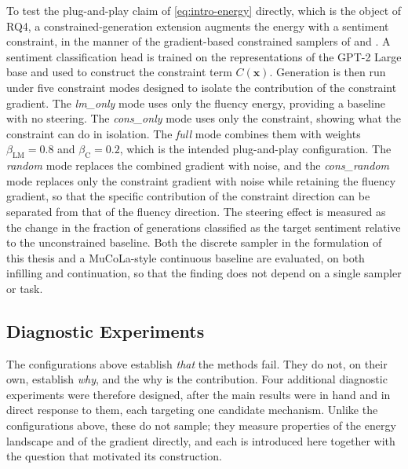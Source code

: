 To test the plug-and-play claim of \eqref{eq:intro-energy} directly, which is the object of RQ4, a constrained-generation extension augments the energy with a sentiment constraint, in the manner of the gradient-based constrained samplers of \citet{kumar2022gradient} and \citet{qin2022cold}. A sentiment classification head is trained on the representations of the GPT-2 Large base and used to construct the constraint term $C(\bm{x})$. Generation is then run under five constraint modes designed to isolate the contribution of the constraint gradient. The \emph{lm\_only} mode uses only the fluency energy, providing a baseline with no steering. The \emph{cons\_only} mode uses only the constraint, showing what the constraint can do in isolation. The \emph{full} mode combines them with weights $\beta_{\text{LM}} = 0.8$ and $\beta_{\text{C}} = 0.2$, which is the intended plug-and-play configuration. The \emph{random} mode replaces the combined gradient with noise, and the \emph{cons\_random} mode replaces only the constraint gradient with noise while retaining the fluency gradient, so that the specific contribution of the constraint direction can be separated from that of the fluency direction. The steering effect is measured as the change in the fraction of generations classified as the target sentiment relative to the unconstrained baseline. Both the discrete sampler in the formulation of this thesis and a MuCoLa-style continuous baseline are evaluated, on both infilling and continuation, so that the finding does not depend on a single sampler or task.

\subsection{Diagnostic Experiments}
\label{sec:meth-diagnostics}

The configurations above establish \emph{that} the methods fail. They do not, on their own, establish \emph{why}, and the why is the contribution. Four additional diagnostic experiments were therefore designed, after the main results were in hand and in direct response to them, each targeting one candidate mechanism. Unlike the configurations above, these do not sample; they measure properties of the energy landscape and of the gradient directly, and each is introduced here together with the question that motivated its construction.

